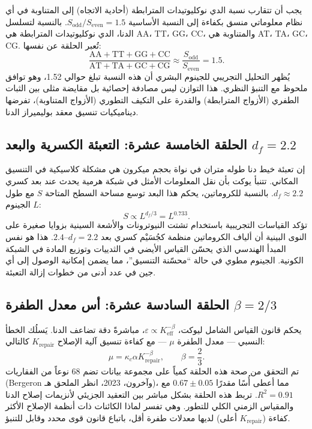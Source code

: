 \documentclass[11pt,a4paper]{article}
\newcommand{\Keff}{K_{\mathrm{eff}}}
\newcommand{\Sodd}{S_{\mathrm{odd}}}
\newcommand{\Seven}{S_{\mathrm{even}}}
\begin{document}
	يجب أن تتقارب نسبة الدي نوكليوتيدات المترابطة (أحادية الاتجاه) إلى المتناوبة في أي نظام معلوماتي منسق بكفاءة إلى النسبة الأساسية \(\Sodd/\Seven = 1.5\). بالنسبة لتسلسل الدنا، الدي نوكليوتيدات المترابطة هي AA، TT، GG، CC، والمتناوبة هي AT، TA، GC، CG. تُعبر الحلقة عن نفسها:
	\begin{equation}
		\boxed{ \frac{\text{AA} + \text{TT} + \text{GG} + \text{CC}}{\text{AT} + \text{TA} + \text{GC} + \text{CG}} \approx \frac{\Sodd}{\Seven} = 1.5 }.
	\end{equation}
	يُظهر التحليل التجريبي للجينوم البشري أن هذه النسبة تبلغ حوالي 1.52، وهو توافق ملحوظ مع التنبؤ النظري. هذا التوازن ليس مصادفة إحصائية بل مقايضة مثلى بين الثبات الطفري (الأزواج المترابطة) والقدرة على التكيف التطوري (الأزواج المتناوبة)، تفرضها ديناميكيات تنسيق معقد بوليميراز الدنا.
	
	\subsection{الحلقة الخامسة عشرة: التعبئة الكسرية والبعد \(d_f = 2.2\)}
	
	إن تعبئة خيط دنا طوله متران في نواة بحجم ميكرون هي مشكلة كلاسيكية في التنسيق المكاني. تتنبأ يوكت بأن نقل المعلومات الأمثل في شبكة هرمية يحدث عند بعد كسري \(d_f \approx 2.2\). بالنسبة للكروماتين، يحكم هذا البعد توسع مساحة السطح المتاحة \(S\) مع طول الجينوم \(L\):
	\begin{equation}
		\boxed{ S \propto L^{d_f/3} = L^{0.733} }.
	\end{equation}
	تؤكد القياسات التجريبية باستخدام تشتت النيوترونات والأشعة السينية بزوايا صغيرة على النوى البينية أن ألياف الكروماتين منظمة كجُسَيْم كسري بعد \(d_f = 2.2\)–\(2.4\). هذا هو نفس المبدأ الهندسي الذي يحسّن القياس الأيضي في الثدييات وتوزيع المادة في الشبكة الكونية. الجينوم مطوي في حالة ``محسّنة التنسيق''، مما يضمن إمكانية الوصول إلى أي جين في عدد أدنى من خطوات إزالة التعبئة.
	
	\subsection{الحلقة السادسة عشرة: أس معدل الطفرة \(\beta = 2/3\)}
	
	يحكم قانون القياس الشامل ليوكت، \(\varepsilon \propto \Keff^{-\beta}\)، مباشرةً دقة تضاعف الدنا. يَسلُك الخطأ النسبي — معدل الطفرة \(\mu\) — مع كفاءة تنسيق آلية الإصلاح \(K_{\mathrm{repair}}\) كالتالي:
	\begin{equation}
		\boxed{ \mu = \kappa_c \alpha K_{\mathrm{repair}}^{-\beta}, \qquad \beta = \frac{2}{3} }.
	\end{equation}
	تم التحقق من صحة هذه الحلقة كمياً على مجموعة بيانات تضم 68 نوعاً من الفقاريات (Bergeron وآخرون، 2023، انظر الملحق هـ)، مما أعطى أُسًا مقدرًا \(0.67 \pm 0.05\) مع \(R^2 = 0.91\). تربط هذه الحلقة بشكل مباشر بين التعقيد الجزيئي لأنزيمات إصلاح الدنا والمقياس الزمني الكلي للتطور. وهي تفسر لماذا الكائنات ذات أنظمة الإصلاح الأكثر كفاءة (\(K_{\mathrm{repair}}\) أعلى) لديها معدلات طفرة أقل، باتباع قانون قوى محدد وقابل للتنبؤ.
	
\end{document}
